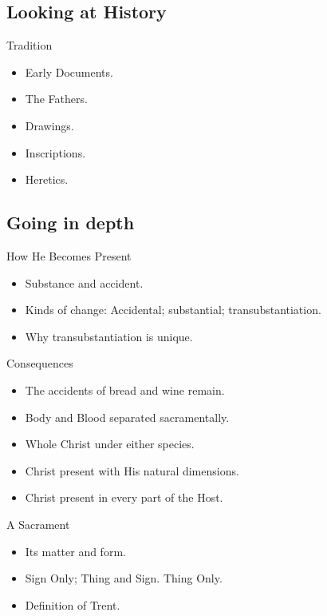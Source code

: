 \documentclass{beamer}
\begin{document}
\subsection{Looking at History}

\begin{frame}{Tradition}
\begin{itemize}
\item Early Documents.
\item The Fathers.
\item Drawings.
\item Inscriptions. 
\item Heretics.
\end{itemize}
\end{frame}

\subsection{Going in depth}

\begin{frame}{How He Becomes Present}
 
\begin{itemize}
\item Substance and accident.
\item Kinds of change: Accidental; substantial; transubstantiation.
\item Why transubstantiation is unique.
\end{itemize}
\end{frame}

\begin{frame}{Consequences}
\begin{itemize}
\item The accidents of bread and wine remain.
\item Body and Blood separated sacramentally.
\item Whole Christ under either species.
\item Christ present with His natural dimensions.
\item Christ present in every part of the Host.
\end{itemize}
\end{frame}

\begin{frame}{A Sacrament}
\begin{itemize}
\item Its matter and form.
\item Sign Only; Thing and Sign. Thing Only.
\item Definition of Trent.
\end{itemize}
\end{frame}
\end{document}
